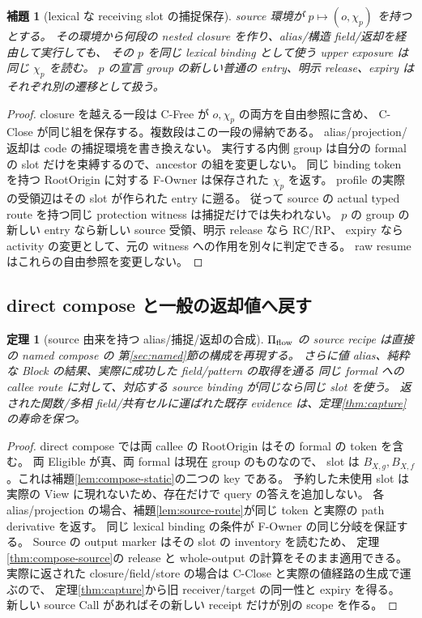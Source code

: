 \documentclass[11pt,a4paper]{article}
\newtheorem{lemma}[definition]{補題}
\newtheorem{theorem}[definition]{定理}
\begin{document}
\begin{lemma}[lexical な receiving slot の捕捉保存]
\label{lem:home-capture}
source 環境が \(p\mapsto(o,\chi_p)\) を持つとする。
その環境から何段の nested closure を作り、alias/構造 field/返却を経由して実行しても、
その \(p\) を同じ lexical binding として使う upper exposure は同じ \(\chi_p\) を読む。
\(p\) の宣言 group の新しい普通の entry、明示 release、expiry はそれぞれ別の遷移として扱う。
\end{lemma}
\begin{proof}
closure を越える一段は C-Free が \(o,\chi_p\) の両方を自由参照に含め、
C-Close が同じ組を保存する。複数段はこの一段の帰納である。
alias/projection/返却は code の捕捉環境を書き換えない。
実行する内側 group は自分の formal の slot だけを束縛するので、ancestor の組を変更しない。
同じ binding token を持つ RootOrigin に対する F-Owner は保存された \(\chi_p\) を返す。
profile の実際の受領辺はその slot が作られた entry に遡る。
従って source の actual typed route を持つ同じ protection witness は捕捉だけでは失われない。
\(p\) の group の新しい entry なら新しい source 受領、明示 release なら RC/RP、
expiry なら activity の変更として、元の witness への作用を別々に判定できる。
raw resume はこれらの自由参照を変更しない。
\end{proof}

\subsection{direct compose と一般の返却値へ戻す}

\begin{theorem}[source 由来を持つ alias/捕捉/返却の合成]
\label{thm:flow-compose}
\(\Pi_{\rm flow}\) の source recipe は直接の named compose の
第\ref{sec:named}節の構成を再現する。
さらに値 alias、純粋な Block の結果、実際に成功した field/pattern の取得を通る
同じ formal への callee route に対して、対応する source binding が同じなら同じ slot を使う。
返された関数/多相 field/共有セルに運ばれた既存 evidence は、定理\ref{thm:capture}の寿命を保つ。
\end{theorem}
\begin{proof}
direct compose では両 callee の RootOrigin はその formal の token を含む。
両 Eligible が真、両 formal は現在 group のものなので、
slot は \(B_{X,g},B_{X,f}\)。これは補題\ref{lem:compose-static}の二つの key である。
予約した未使用 slot は実際の View に現れないため、存在だけで query の答えを追加しない。
各 alias/projection の場合、補題\ref{lem:source-route}が同じ token と実際の path derivative を返す。
同じ lexical binding の条件が F-Owner の同じ分岐を保証する。
Source の output marker はその slot の inventory を読むため、
定理\ref{thm:compose-source}の release と whole-output の計算をそのまま適用できる。
実際に返された closure/field/store の場合は C-Close と実際の値経路の生成で運ぶので、
定理\ref{thm:capture}から旧 receiver/target の同一性と expiry を得る。
新しい source Call があればその新しい receipt だけが別の scope を作る。
\end{proof}
\end{document}
